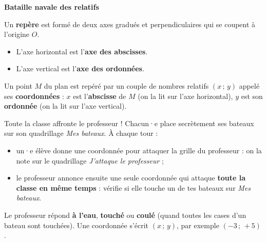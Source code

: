 \documentclass[11pt]{article}
\begin{document}
\textbf{\LARGE Bataille navale des relatifs}\\[0.3em]

\begin{rappel}
\begin{minipage}[c]{0.56\linewidth}
Un \textbf{repère} est formé de deux axes gradués et perpendiculaires qui
se coupent à l'origine $O$.
\begin{itemize}[itemsep=1pt,topsep=2pt]
\item L'axe horizontal est l'\textbf{axe des abscisses}.
\item L'axe vertical est l'\textbf{axe des ordonnées}.
\end{itemize}
Un point $M$ du plan est repéré par un couple de nombres relatifs
$(x\,;\,y)$ appelé ses \textbf{coordonnées} : $x$ est
l'\textbf{abscisse} de $M$ (on la lit sur l'axe horizontal), $y$ est
son \textbf{ordonnée} (on la lit sur l'axe vertical).
\end{minipage}\hfill
\begin{minipage}[c]{0.4\linewidth}
\centering
{}
\end{minipage}
\end{rappel}

\smallskip

Toute la classe affronte le professeur ! Chacun·e place secrètement ses
bateaux sur son quadrillage \textit{Mes bateaux}. À chaque tour :
\begin{itemize}[itemsep=0pt,topsep=2pt]
\item un·e élève donne une coordonnée pour attaquer la grille du
professeur : on la note sur le quadrillage \textit{J'attaque le
professeur} ;
\item le professeur annonce ensuite une seule coordonnée qui attaque
\textbf{toute la classe en même temps} : vérifie si elle touche un de tes
bateaux sur \textit{Mes bateaux}.
\end{itemize}
Le professeur répond \textbf{à l'eau}, \textbf{touché} ou \textbf{coulé}
(quand toutes les cases d'un bateau sont touchées). Une coordonnée
s'écrit $(x\,;\,y)$, par exemple $(-3\,;\,+5)$.
\end{document}
